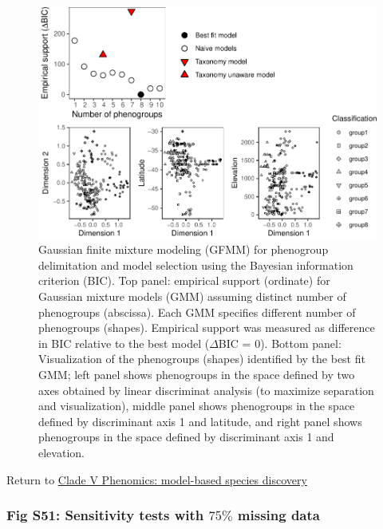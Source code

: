 \documentclass[
  11pt,
]{article}
\begin{document}
\begin{figure}
\includegraphics{Supplementary_Material_files/figure-latex/cladeVmorphologicalDelimitationPlots-1} \caption{Gaussian finite mixture modeling (GFMM) for phenogroup delimitation and model selection using the Bayesian information criterion (BIC). Top panel: empirical support (ordinate) for Gaussian mixture models (GMM) assuming distinct number of phenogroups (abscissa). Each GMM specifies different number of phenogroups (shapes). Empirical support was measured as difference in BIC relative to the best model ($\Delta$BIC = $0$). Bottom panel: Visualization of the phenogroups (shapes) identified by the best fit GMM; left panel shows phenogroups in the space defined by two axes obtained by linear discriminat analysis (to maximize separation and visualization), middle panel shows phenogroups in the space defined by discriminant axis 1 and latitude, and right panel shows phenogroups in the space defined by discriminant axis 1 and elevation.}\label{fig:cladeVmorphologicalDelimitationPlots}
\end{figure}

Return to \protect\hyperlink{model-based-species-discovery-8}{Clade V Phenomics: model-based species discovery}
\pagebreak

\hypertarget{fig-s51-sensitivity-tests-with-75-missing-data}{%
\subsubsection{\texorpdfstring{Fig S51: Sensitivity tests with \(75\%\) missing data}{Fig S51: Sensitivity tests with 75\textbackslash\% missing data}}\label{fig-s51-sensitivity-tests-with-75-missing-data}}
\end{document}
